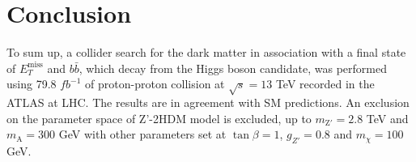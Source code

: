 \documentclass[class=NCU_thesis, crop=false]{standalone}
\begin{document}
	
\chapter{Conclusion}
	To sum up, a collider search for the dark matter in association with a final state of $E_T^{\mathrm{miss}}$ and $b\bar{b}$, which decay from the Higgs boson candidate, was performed using 79.8 $fb^{-1}$ of proton-proton collision at $\sqrt{s} = 13$ TeV recorded in the ATLAS at LHC. The results are in agreement with SM predictions. An exclusion on the parameter space of Z'-2HDM model is excluded, up to $m_{\mathrm{Z'}} = 2.8$ TeV and $m_{\mathrm{A}} = 300$ GeV with other parameters set at $\tan{\beta} = 1$, $g_{Z'} = 0.8$ and $m_{\chi} = 100$ GeV.
\end{document}
